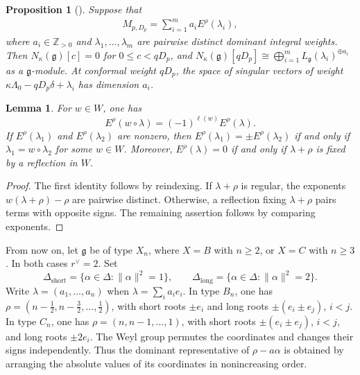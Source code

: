\documentclass[11pt,a4paper]{amsart}
\newcommand{\ZZ}{\mathbb Z}
\theoremstyle{plain}
\newtheorem{lem}[theorem]{Lemma}
\newtheorem{prop}[theorem]{Proposition}
\numberwithin{equation}{section}
\newenvironment{pf}{\begin{proof}}{\end{proof}}
\begin{document}
\begin{prop}[{\cite[Theorem~3.4]{JS26}}]
\label{prop:first-jantzen-layer}
Suppose that
\begin{align}
M_{p,D_p}=\sum_{i=1}^m a_iE^\rho(\lambda_i),
\end{align}
where \(a_i\in\ZZ_{>0}\) and
\(\lambda_1,\ldots,\lambda_m\) are pairwise distinct dominant
integral weights.
Then \(N_\kappa(\mathfrak g)[c]=0\) for \(0\le c<qD_p\), and
\(N_\kappa(\mathfrak g)[qD_p]
\cong\displaystyle\bigoplus_{i=1}^m
L_{\mathfrak g}(\lambda_i)^{\oplus a_i}\)
as a \(\mathfrak g\)-module.
At conformal weight \(qD_p\), the space of singular vectors of
weight \(\kappa\Lambda_0-qD_p\delta+\lambda_i\) has dimension
\(a_i\). 
\end{prop}

\begin{lem}\label{general E=0 criteria}
For \(w\in W\), one has
\[
E^\rho(w\circ\lambda)=(-1)^{\ell(w)}E^\rho(\lambda).
\]
If \(E^\rho(\lambda_1)\) and \(E^\rho(\lambda_2)\) are nonzero,
then \(E^\rho(\lambda_1)=\pm E^\rho(\lambda_2)\) if and only if
\(\lambda_1=w\circ\lambda_2\) for some \(w\in W\).
Moreover, \(E^\rho(\lambda)=0\) if and only if
\(\lambda+\rho\) is fixed by a reflection in \(W\).
\end{lem}

\begin{pf}
The first identity follows by reindexing.
If \(\lambda+\rho\) is regular, the exponents
\(w(\lambda+\rho)-\rho\) are pairwise distinct.
Otherwise, a reflection fixing \(\lambda+\rho\) pairs terms
with opposite signs.
The remaining assertion follows by comparing exponents.
\end{pf}

From now on, let \(\mathfrak g\) be of type \(X_n\), where
\(X=B\) with \(n\ge2\), or \(X=C\) with \(n\ge3\).
In both cases \(r^\vee=2\). Set
\[
\Delta_{\mathrm{short}}
=\{\alpha\in\Delta:\|\alpha\|^2=1\},
\qquad
\Delta_{\mathrm{long}}
=\{\alpha\in\Delta:\|\alpha\|^2=2\}.
\]
Write \(\lambda=(a_1,\ldots,a_n)\) when
\(\lambda=\sum_i a_i e_i\).
In type \(B_n\), one has
\(\rho=(n-\frac12,n-\frac32,\dots,\frac12)\),
with short roots \(\pm e_i\) and long roots
\(\pm(e_i\pm e_j)\), \(i<j\).
In type \(C_n\), one has \(\rho=(n,n-1,\dots,1)\),
with short roots \(\pm(e_i\pm e_j)\), \(i<j\), and long roots
\(\pm2e_i\).
The Weyl group permutes the coordinates and changes their
signs independently. Thus the dominant representative of
\(\rho-a\alpha\) is obtained by arranging the absolute values
of its coordinates in nonincreasing order.
\end{document}
